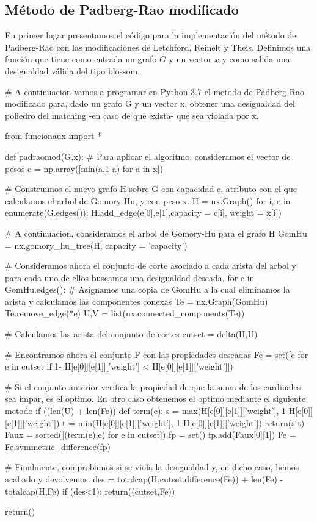 \documentclass[twoside,a4paper,openright,12pt]{book}
\begin{document}
\subsection{Método de Padberg-Rao modificado}
En primer lugar presentamos el código para la implementación del método de Padberg-Rao con las modificaciones de Letchford, Reinelt y Theis. Definimos una función que tiene como entrada un grafo $G$ y un vector $x$ y como salida una desigualdad válida del tipo blossom. 
\begin{pythone}
# A continuacion vamos a programar en Python 3.7 el metodo de Padberg-Rao modificado para, dado un grafo G y un vector x, obtener una desigualdad del poliedro del matching -en caso de que exista- que sea violada por x.

from funcionaux import *

def padraomod(G,x):
    # Para aplicar el algoritmo, consideramos el vector de pesos
    c = np.array([min(a,1-a) for a in x])
    
    # Construimos el nuevo grafo H sobre G con capacidad c, atributo con el que calculamos el arbol de Gomory-Hu, y con peso x.
    H = nx.Graph()
    for i, e in enumerate(G.edges()):
        H.add_edge(e[0],e[1],capacity = c[i], weight = x[i])
        
    # A continuacion, consideramos el arbol de Gomory-Hu para el grafo H
    GomHu = nx.gomory_hu_tree(H, capacity = 'capacity')
    
    
    # Consideramos ahora el conjunto de corte asociado a cada arista del arbol y para cada uno de ellos buscamos una desigualdad deseada.
    for e in GomHu.edges():
        # Asignamos una copia de GomHu a la cual eliminamos la arista y calculamos las componentes conexas
        Te = nx.Graph(GomHu)
        Te.remove_edge(*e)
        U,V = list(nx.connected_components(Te))
        
        # Calculamos las arista del conjunto de cortes
        cutset = delta(H,U)
        
        #  Encontramos ahora el conjunto F con las propiedades deseadas 
        Fe = set([e for e in cutset if 1- H[e[0]][e[1]]['weight'] < 
              H[e[0]][e[1]]['weight']])
        
        # Si el conjunto anterior verifica la propiedad de que la suma de los cardinales sea impar, es el optimo. En otro caso obtenemos el optimo mediante el siguiente metodo
        if ((len(U) + len(Fe)) %
            def term(e):
                s = max(H[e[0]][e[1]]['weight'],
              	  1-H[e[0]][e[1]]['weight'])
                t = min(H[e[0]][e[1]]['weight'],
             	   1-H[e[0]][e[1]]['weight'])
                return(s-t)
            Faux = sorted([(term(e),e) for e in cutset])
            fp = set()
            fp.add(Faux[0][1])
            Fe = Fe.symmetric_difference(fp)
        
        # Finalmente, comprobamos si se viola la desigualdad y, en dicho caso, hemos acabado y devolvemos.
        des = totalcap(H,cutset.difference(Fe)) + len(Fe) - totalcap(H,Fe)
        if (des<1):
            return((cutset,Fe))
          
    return()
\end{pythone}
\newpage
\end{document}
